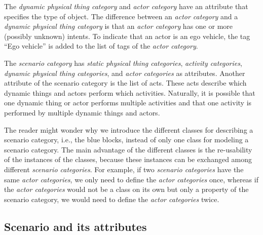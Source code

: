 The \cstartb \textit{dynamic physical thing category} and \cendb \textit{actor category} have an attribute that specifies the type of object.
\cstartb The difference between an \textit{actor category} and a \textit{dynamic physical thing category} is that an \textit{actor category} has \cendb\cstarte one or more \cende\cstartb (possibly unknown) intents. \cendb
To indicate that an actor is an ego vehicle, the tag ``Ego vehicle'' is added to the list of tags of the \textit{actor category}.

The \textit{scenario category} has \cstartc \textit{static physical thing categories}\cendc, \textit{activity categories}, \cstartb \textit{dynamic physical thing categories}, \cendb and \textit{actor categories} as attributes. 
Another attribute of the scenario category is the list of acts. %
These acts describe which \cstartb dynamic things and \cendb actors perform which activities. Naturally, it is possible that one \cstartb dynamic thing or \cendb actor performs multiple activities and that one activity is performed by multiple \cstartb dynamic things and \cendb actors.

The reader might wonder why we introduce the different classes for describing a scenario category, i.e., the blue blocks, instead of only one class for modeling a scenario category. 
The main advantage of the different classes is the re-usability of the instances of the classes, because these instances can be exchanged among different \textit{scenario categories}. For example, if two \textit{scenario categories} have the same \textit{actor categories}, we only need to define the \textit{actor categories} once, whereas if the \textit{actor categories} would not be a class on its own but only a property of the scenario category, we would need to define the \textit{actor categories} twice.



\subsection{Scenario and its attributes}
\label{sec:domain scenario}

